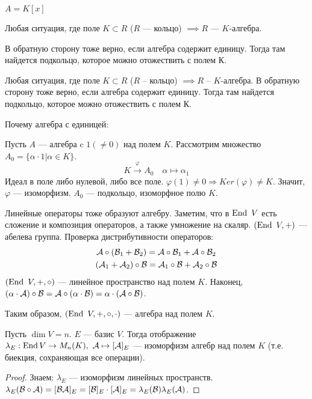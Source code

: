 \documentclass[main]{subfiles}
\begin{document}
\begin{example}
    $A = K[x]$
\end{example}   
\begin{example}
    Любая ситуация, где поле $K \subset R$ ($R$ —  кольцо) $\implies R$ — $K$-алгебра. 
    
    В обратную сторону тоже верно, если алгебра содержит единицу. Тогда там найдется подкольцо, которое можно отожествить с полем К.

    Любая ситуация, где поле $K \subset R$ ($R$ -- кольцо) $\implies R$ -- $K$-алгебра. 
    В обратную сторону тоже верно, если алгебра содержит единицу. Тогда там найдется подкольцо, которое можно отожествить с полем $К$.

    
    Почему алгебра с единицей: 

    Пусть $A$ —  алгебра c $1(\neq0)$ над полем $K$.
    Рассмотрим множество $A_0 = \{\alpha \cdot 1| \alpha \in K\}$. 
    \[K \xrightarrow{\varphi} A_0 \quad \alpha \mapsto \alpha_1\]
    Идеал в поле либо нулевой, либо все поле. 
    $\varphi(1) \neq 0 \Rightarrow Ker(\varphi)\neq K$. 
    Значит,  $\varphi$ — изоморфизм. $A_0$ — подкольцо, изоморфное полю $K$.
\end{example}


Линейные операторы тоже образуют алгебру. Заметим, что в $\operatorname{End} \ V$ есть сложение и композиция операторов, а также умножение на скаляр. 
$(\operatorname{End} \ V, +)$ — абелева группа. Проверка дистрибутивности операторов:
\begin{gather*}
    \mathcal{A}\circ(\mathcal{B}_1+\mathcal{B}_2) = \mathcal{A}\circ\mathcal{B}_1 + \mathcal{A}\circ\mathcal{B}_2 \\
    (\mathcal{A}_1 + \mathcal{A}_2)\circ\mathcal{B} = \mathcal{A}_1\circ\mathcal{B}+\mathcal{A}_2\circ\mathcal{B}
\end{gather*}
$(\operatorname{End} \ V, +, \circ)$ — линейное пространство над полем $K$. Наконец,
$(\alpha\cdot\mathcal{A})\circ\mathcal{B}=\mathcal{A}\circ(\alpha\cdot\mathcal{B})=\alpha\cdot(\mathcal{A}\circ\mathcal{B})$.
 
Таким образом, $(\operatorname{End} \ V, +, \circ, \cdot)$ — алгебра над полем $K$.




\begin{proposition}
Пусть $\dim V = n$. $E$ — базис $V$. 
Тогда отображение $\lambda_E : \operatorname{End} V \rightarrow M_n(K), \ \mathcal{A} \mapsto [\mathcal{A}]_E$ — изоморфизм алгебр над полем $K$ (т.е. биекция, сохраняющая все операции).
\end{proposition}

\begin{proof}
    Знаем: $\lambda_E$ — изоморфизм линейных пространств. $\lambda_E(\mathcal{B}\circ\mathcal{A})=[\mathcal{B}\mathcal{A}]_E=[\mathcal{B}]_E\cdot[\mathcal{A}]_E = \lambda_E(\mathcal{B})\lambda_E(\mathcal{A})$.
\end{proof}
\end{document}
